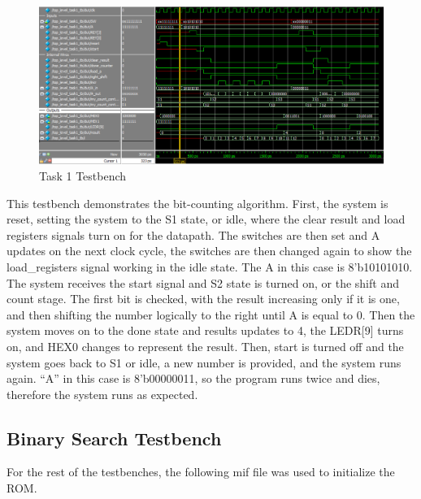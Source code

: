 \documentclass[11pt, titlepage]{article}
\begin{document}
            \begin{figure}[H]
                \centering
                \includegraphics[scale=0.5]{Images/task 1 testbench.png}
                \caption{Task 1 Testbench}
            \end{figure}
            
            This testbench demonstrates the bit-counting algorithm. First, the system is reset, setting the system to the S1 state, or idle, where the clear result and load registers signals turn on for the datapath. The switches are then set and A updates on the next clock cycle, the switches are then changed again to show the load\_registers signal working in the idle state. The A in this case is 8'b10101010. The system receives the start signal and S2 state is turned on, or the shift and count stage. The first bit is checked, with the result increasing only if it is one, and then shifting the number logically to the right until A is equal to 0. Then the system moves on to the done state and results updates to 4, the LEDR[9] turns on, and HEX0 changes to represent the result. Then, start is turned off and the system goes back to S1 or idle, a new number is provided, and the system runs again. ``A'' in this case is 8'b00000011, so the program runs twice and dies, therefore the system runs as expected.
        \newpage

        \subsection{Binary Search Testbench}
            For the rest of the testbenches, the following mif file was used to initialize the ROM. 
\end{document}
